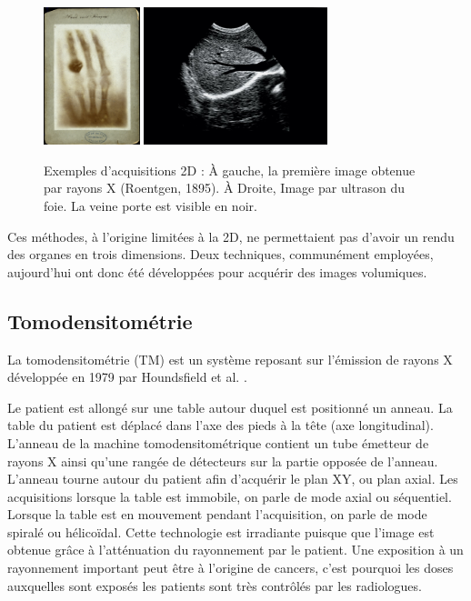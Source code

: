 \begin{figure}
    \centering
    \includegraphics[height=4cm]{Images/first_CT.png}
    \includegraphics[height=4cm]{Images/Liver_ultrasound.jpg}
    \caption{Exemples d'acquisitions 2D : À gauche, la première image obtenue par rayons X (Roentgen, 1895). À Droite, Image par ultrason du foie. La veine porte est visible en noir.}
    \label{fig:2D imaging}
\end{figure}

Ces méthodes, à l'origine limitées à la 2D, ne permettaient pas d'avoir un rendu des organes en trois dimensions. Deux techniques, communément employées, aujourd'hui ont donc été développées pour acquérir des images volumiques.

\subsection{Tomodensitométrie}
\label{sec:contexte:images:CT}

La tomodensitométrie (TM) est un système reposant sur l'émission de rayons X développée en 1979 par Houndsfield et al. \cite{Houndfield1995_CT_machine}.

Le patient est allongé sur une table autour duquel est positionné un anneau. La table du patient est déplacé dans l'axe des pieds à la tête (axe longitudinal). L'anneau de la machine tomodensitométrique contient un tube émetteur de rayons X ainsi qu'une rangée de détecteurs sur la partie opposée de l'anneau. L'anneau tourne autour du patient afin d'acquérir le plan XY, ou plan axial. Les acquisitions lorsque la table est immobile, on parle de mode axial ou séquentiel. Lorsque la table est en mouvement pendant l'acquisition, on parle de mode spiralé ou hélicoïdal. Cette technologie est irradiante puisque que l'image est obtenue grâce à l'atténuation du rayonnement par le patient. Une exposition à un rayonnement important peut être à l'origine de cancers, c'est pourquoi les doses auxquelles sont exposés les patients sont très contrôlés par les radiologues.

